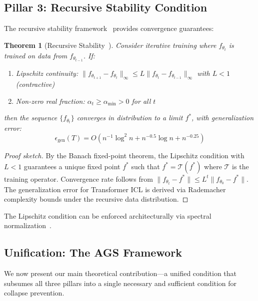 \documentclass[11pt]{article}
\newtheorem{theorem}{Theorem}
\begin{document}
\subsection{Pillar 3: Recursive Stability Condition}

The recursive stability framework~\citep{recursive2025} provides convergence guarantees:

\begin{theorem}[Recursive Stability~\citep{recursive2025}]
\label{thm:stability}
Consider iterative training where $f_{\theta_t}$ is trained on data from $f_{\theta_{t-1}}$. If:
\begin{enumerate}[nosep]
    \item \textit{Lipschitz continuity}: $\|f_{\theta_{t+1}} - f_{\theta_t}\|_{\infty} \leq L \|f_{\theta_t} - f_{\theta_{t-1}}\|_{\infty}$ with $L < 1$ (contractive)
    \item \textit{Non-zero real fraction}: $\alpha_t \geq \alpha_{\min} > 0$ for all $t$
\end{enumerate}
then the sequence $\{f_{\theta_t}\}$ converges in distribution to a limit $f^*$, with generalization error:
\begin{equation}
    \epsilon_{\mathrm{gen}}(T) = O\!\left(n^{-1}\log^2 n + n^{-0.5}\log n + n^{-0.25}\right)
\end{equation}
\end{theorem}

\begin{proof}[Proof sketch]
By the Banach fixed-point theorem, the Lipschitz condition with $L<1$ guarantees a unique fixed point $f^*$ such that $f^* = \mathcal{T}(f^*)$ where $\mathcal{T}$ is the training operator. Convergence rate follows from $\|f_{\theta_t} - f^*\| \leq L^t \|f_{\theta_0} - f^*\|$. The generalization error for Transformer ICL is derived via Rademacher complexity bounds under the recursive data distribution.
\end{proof}

The Lipschitz condition can be enforced architecturally via spectral normalization~\citep{iconE2026,minimal2026}.

\subsection{Unification: The AGS Framework}
\label{sec:ags}

We now present our main theoretical contribution---a unified condition that subsumes all three pillars into a single necessary and sufficient condition for collapse prevention.
\end{document}

